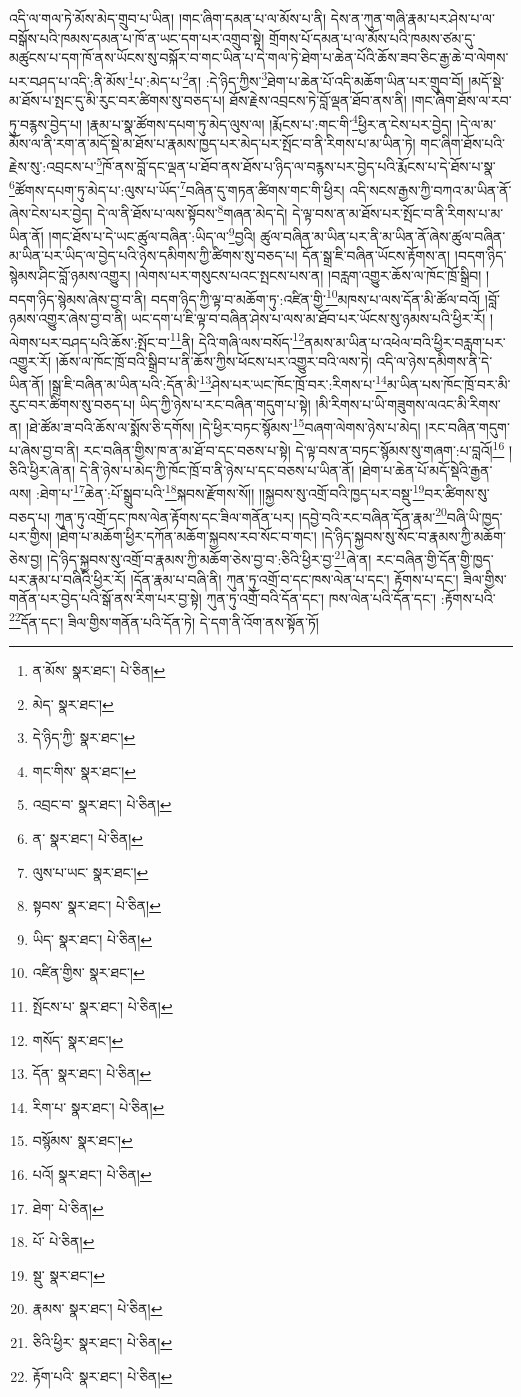 འདི་ལ་གལ་ཏེ་མོས་མེད་གྲུབ་པ་ཡིན། །གང་ཞིག་དམན་པ་ལ་མོས་པ་ནི། དེས་ན་ཀུན་གཞི་རྣམ་པར་ཤེས་པ་ལ་བསྒོས་པའི་ཁམས་དམན་པ་ཁོ་ན་ཡང་དག་པར་འགྲུབ་སྟེ། གྲོགས་པོ་དམན་པ་ལ་མོས་པའི་ཁམས་ཙམ་དུ་མཚུངས་པ་དག་ཁོ་ནས་ཡོངས་སུ་བསྐོར་བ་གང་ཡིན་པ་དེ་གལ་ཏེ་ཐེག་པ་ཆེན་པོའི་ཆོས་ཟབ་ཅིང་རྒྱ་ཆེ་བ་ལེགས་པར་བཤད་པ་འདི་:ནི་མོས་\footnote{ན་མོས་  སྣར་ཐང་།  པེ་ཅིན། }པ་:མེད་པ་\footnote{མེད་  སྣར་ཐང་། }ན། :དེ་ཉིད་ཀྱིས་\footnote{དེ་ཉིད་ཀྱི་  སྣར་ཐང་། }ཐེག་པ་ཆེན་པོ་འདི་མཆོག་ཡིན་པར་གྲུབ་བོ། །མདོ་སྡེ་མ་ཐོས་པ་སྤང་དུ་མི་རུང་བར་ཚིགས་སུ་བཅད་པ། ཐོས་རྗེས་འབྲངས་ཏེ་བློ་ལྡན་ཐོབ་ནས་ནི། །གང་ཞིག་ཐོས་ལ་རབ་ཏུ་བརྙས་བྱེད་པ། །རྣམ་པ་སྣ་ཚོགས་དཔག་ཏུ་མེད་ལུས་ལ། །རྨོངས་པ་:གང་གི་\footnote{གང་གིས་  སྣར་ཐང་། }ཕྱིར་ན་ངེས་པར་བྱེད། །དེ་ལ་མ་མོས་ལ་ནི་རག་ན་མདོ་སྡེ་མ་ཐོས་པ་རྣམས་ཁྱད་པར་མེད་པར་སྤོང་བ་ནི་རིགས་པ་མ་ཡིན་ཏེ། གང་ཞིག་ཐོས་པའི་རྗེས་སུ་:འབྲངས་པ་\footnote{འབྲང་བ་  སྣར་ཐང་།  པེ་ཅིན། }ཁོ་ནས་བློ་དང་ལྡན་པ་ཐོབ་ནས་ཐོས་པ་ཉིད་ལ་བརྙས་པར་བྱེད་པའི་རྨོངས་པ་དེ་ཐོས་པ་སྣ་\footnote{ན་  སྣར་ཐང་།  པེ་ཅིན། }ཚོགས་དཔག་ཏུ་མེད་པ་:ལུས་པ་ཡོད་\footnote{ལུས་པ་ཡང་  སྣར་ཐང་། }བཞིན་དུ་གཏན་ཚིགས་གང་གི་ཕྱིར། འདི་སངས་རྒྱས་ཀྱི་བཀའ་མ་ཡིན་ནོ་ཞེས་ངེས་པར་བྱེད། དེ་ལ་ནི་ཐོས་པ་ལས་སྟོབས་\footnote{སྟབས་  སྣར་ཐང་།  པེ་ཅིན། }གཞན་མེད་དེ། དེ་ལྟ་བས་ན་མ་ཐོས་པར་སྤོང་བ་ནི་རིགས་པ་མ་ཡིན་ནོ། །གང་ཐོས་པ་དེ་ཡང་ཚུལ་བཞིན་:ཡིད་ལ་\footnote{ཡིད་  སྣར་ཐང་།  པེ་ཅིན། }བྱའི། ཚུལ་བཞིན་མ་ཡིན་པར་ནི་མ་ཡིན་ནོ་ཞེས་ཚུལ་བཞིན་མ་ཡིན་པར་ཡིད་ལ་བྱེད་པའི་ཉེས་དམིགས་ཀྱི་ཚིགས་སུ་བཅད་པ། དོན་སྒྲ་ཇི་བཞིན་ཡོངས་རྟོགས་ན། །བདག་ཉིད་སྙེམས་ཤིང་བློ་ཉམས་འགྱུར། །ལེགས་པར་གསུངས་པའང་སྤངས་པས་ན། །བརླག་འགྱུར་ཆོས་ལ་ཁོང་ཁྲོ་སྒྲིབ། །བདག་ཉིད་སྙེམས་ཞེས་བྱ་བ་ནི། བདག་ཉིད་ཀྱི་ལྟ་བ་མཆོག་ཏུ་:འཛིན་གྱི་\footnote{འཛིན་གྱིས་  སྣར་ཐང་། }མཁས་པ་ལས་དོན་མི་ཚོལ་བའོ། །བློ་ཉམས་འགྱུར་ཞེས་བྱ་བ་ནི། ཡང་དག་པ་ཇི་ལྟ་བ་བཞིན་ཤེས་པ་ལས་མ་ཐོབ་པར་ཡོངས་སུ་ཉམས་པའི་ཕྱིར་རོ། །ལེགས་པར་བཤད་པའི་ཆོས་:སྤོང་བ་\footnote{སྤོངས་པ་  སྣར་ཐང་།  པེ་ཅིན། }ནི། དེའི་གཞི་ལས་བསོད་\footnote{གསོད་  སྣར་ཐང་། }ནམས་མ་ཡིན་པ་འཕེལ་བའི་ཕྱིར་བརླག་པར་འགྱུར་རོ། །ཆོས་ལ་ཁོང་ཁྲོ་བའི་སྒྲིབ་པ་ནི་ཆོས་ཀྱིས་ཕོངས་པར་འགྱུར་བའི་ལས་ཏེ། འདི་ལ་ཉེས་དམིགས་ནི་དེ་ཡིན་ནོ། །སྒྲ་ཇི་བཞིན་མ་ཡིན་པའི་:དོན་མི་\footnote{དོན་  སྣར་ཐང་།  པེ་ཅིན། }ཤེས་པར་ཡང་ཁོང་ཁྲོ་བར་:རིགས་པ་\footnote{རིག་པ་  སྣར་ཐང་།  པེ་ཅིན། }མ་ཡིན་པས་ཁོང་ཁྲོ་བར་མི་རུང་བར་ཚིགས་སུ་བཅད་པ། ཡིད་ཀྱི་ཉེས་པ་རང་བཞིན་གདུག་པ་སྟེ། །མི་རིགས་པ་ཡི་གཟུགས་ལའང་མི་རིགས་ན། །ཐེ་ཚོམ་ཟ་བའི་ཆོས་ལ་སྨོས་ཅི་དགོས། །དེ་ཕྱིར་བཏང་སྙོམས་\footnote{བསྙོམས་  སྣར་ཐང་། }བཞག་ལེགས་ཉེས་པ་མེད། །རང་བཞིན་གདུག་པ་ཞེས་བྱ་བ་ནི། རང་བཞིན་གྱིས་ཁ་ན་མ་ཐོ་བ་དང་བཅས་པ་སྟེ། དེ་ལྟ་བས་ན་བཏང་སྙོམས་སུ་གཞག་:པ་བླའོ།\footnote{པའོ།  སྣར་ཐང་།  པེ་ཅིན། } །ཅིའི་ཕྱིར་ཞེ་ན། དེ་ནི་ཉེས་པ་མེད་ཀྱི་ཁོང་ཁྲོ་བ་ནི་ཉེས་པ་དང་བཅས་པ་ཡིན་ནོ། །ཐེག་པ་ཆེན་པོ་མདོ་སྡེའི་རྒྱན་ལས། :ཐེག་པ་\footnote{ཐེག་  པེ་ཅིན། }ཆེན་:པོ་སྒྲུབ་པའི་\footnote{པོ་  པེ་ཅིན། }སྐབས་རྫོགས་སོ།། །།སྐྱབས་སུ་འགྲོ་བའི་ཁྱད་པར་བསྡུ་\footnote{སྡུ་  སྣར་ཐང་། }བར་ཚིགས་སུ་བཅད་པ། ཀུན་ཏུ་འགྲོ་དང་ཁས་ལེན་རྟོགས་དང་ཟིལ་གནོན་པར། །དབྱེ་བའི་རང་བཞིན་དོན་རྣམ་\footnote{རྣམས་  སྣར་ཐང་།  པེ་ཅིན། }བཞི་ཡི་ཁྱད་པར་གྱིས། །ཐེག་པ་མཆོག་ཕྱིར་དཀོན་མཆོག་སྐྱབས་རབ་སོང་བ་གང་། །དེ་ཉིད་སྐྱབས་སུ་སོང་བ་རྣམས་ཀྱི་མཆོག་ཅེས་བྱ། །དེ་ཉིད་སྐྱབས་སུ་འགྲོ་བ་རྣམས་ཀྱི་མཆོག་ཅེས་བྱ་བ་:ཅིའི་ཕྱིར་བྱ་\footnote{ཅིའི་ཕྱིར་  སྣར་ཐང་།  པེ་ཅིན། }ཞེ་ན། རང་བཞིན་གྱི་དོན་གྱི་ཁྱད་པར་རྣམ་པ་བཞིའི་ཕྱིར་རོ། །དོན་རྣམ་པ་བཞི་ནི། ཀུན་ཏུ་འགྲོ་བ་དང་ཁས་ལེན་པ་དང་། རྟོགས་པ་དང་། ཟིལ་གྱིས་གནོན་པར་བྱེད་པའི་སྒོ་ནས་རིག་པར་བྱ་སྟེ། ཀུན་ཏུ་འགྲོ་བའི་དོན་དང་། ཁས་ལེན་པའི་དོན་དང་། :རྟོགས་པའི་\footnote{རྟོག་པའི་  སྣར་ཐང་།  པེ་ཅིན། }དོན་དང་། ཟིལ་གྱིས་གནོན་པའི་དོན་ཏེ། དེ་དག་ནི་འོག་ནས་སྟོན་ཏོ། 